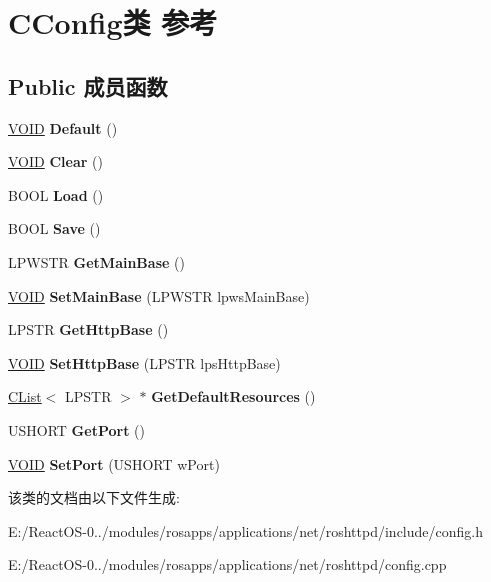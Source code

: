 \hypertarget{class_c_config}{}\section{C\+Config类 参考}
\label{class_c_config}
\subsection*{Public 成员函数}
\begin{DoxyCompactItemize}
\item 
\mbox{\label{class_c_config_a62a7bc368c675cd817368fb2589d642c}} 
\hyperlink{interfacevoid}{V\+O\+ID} {\bfseries Default} ()
\item 
\mbox{\label{class_c_config_a057454da173d0fe4b5c8cd1b8ec0e7e4}} 
\hyperlink{interfacevoid}{V\+O\+ID} {\bfseries Clear} ()
\item 
\mbox{\label{class_c_config_ad4f7bdf0052f98c04885895ed7ac343c}} 
B\+O\+OL {\bfseries Load} ()
\item 
\mbox{\label{class_c_config_a516fba6f4d66276170d90adda83aa901}} 
B\+O\+OL {\bfseries Save} ()
\item 
\mbox{\label{class_c_config_a8f1b0dfac75e62383b6c2f2ccc4c4124}} 
L\+P\+W\+S\+TR {\bfseries Get\+Main\+Base} ()
\item 
\mbox{\label{class_c_config_a0341eb15144157ee5db5d7afc33e6df9}} 
\hyperlink{interfacevoid}{V\+O\+ID} {\bfseries Set\+Main\+Base} (L\+P\+W\+S\+TR lpws\+Main\+Base)
\item 
\mbox{\label{class_c_config_a5f8c38a7b58367a6f2dea136c5ea00b4}} 
L\+P\+S\+TR {\bfseries Get\+Http\+Base} ()
\item 
\mbox{\label{class_c_config_a1a5b26541b7c91e5bd7835fb637c6dd4}} 
\hyperlink{interfacevoid}{V\+O\+ID} {\bfseries Set\+Http\+Base} (L\+P\+S\+TR lps\+Http\+Base)
\item 
\mbox{\label{class_c_config_ae99aa33c552bc3ecf38f8f09c4f2179c}} 
\hyperlink{class_c_list}{C\+List}$<$ L\+P\+S\+TR $>$ $\ast$ {\bfseries Get\+Default\+Resources} ()
\item 
\mbox{\label{class_c_config_ad8a81fa0438fe8a67ec30f4d49e8e43d}} 
U\+S\+H\+O\+RT {\bfseries Get\+Port} ()
\item 
\mbox{\label{class_c_config_a87f12eab26a011dff098bd678c18d046}} 
\hyperlink{interfacevoid}{V\+O\+ID} {\bfseries Set\+Port} (U\+S\+H\+O\+RT w\+Port)
\end{DoxyCompactItemize}


该类的文档由以下文件生成\+:\begin{DoxyCompactItemize}
\item 
E\+:/\+React\+O\+S-\/0../modules/rosapps/applications/net/roshttpd/include/config.\+h\item 
E\+:/\+React\+O\+S-\/0../modules/rosapps/applications/net/roshttpd/config.\+cpp\end{DoxyCompactItemize}
